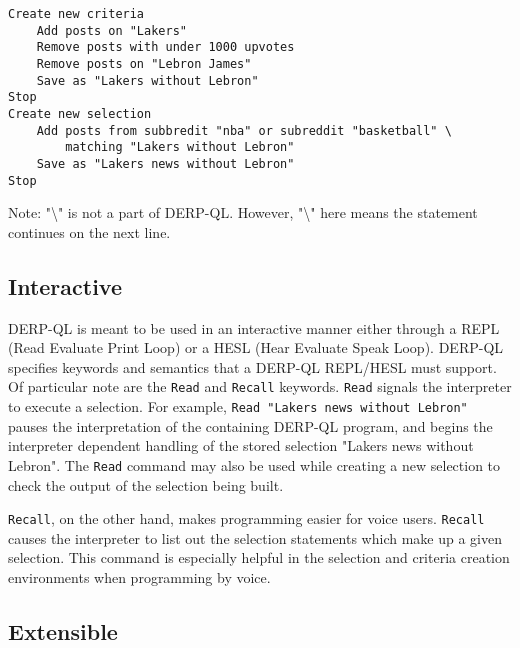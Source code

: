 \begin{lstlisting}
Create new criteria
    Add posts on "Lakers"
    Remove posts with under 1000 upvotes
    Remove posts on "Lebron James"
    Save as "Lakers without Lebron"
Stop
Create new selection
    Add posts from subbredit "nba" or subreddit "basketball" \ 
        matching "Lakers without Lebron"
    Save as "Lakers news without Lebron"
Stop
\end{lstlisting}
Note: "\textbackslash" is not a part of DERP-QL. However, "\textbackslash" here means the statement continues on the next line.

\subsection{Interactive}
DERP-QL is meant to be used in an interactive manner either through a REPL (Read Evaluate Print Loop) or a HESL (Hear Evaluate Speak Loop). DERP-QL specifies keywords and semantics that a DERP-QL REPL/HESL must support. Of particular note are the \texttt{Read} and \texttt{Recall} keywords. \texttt{Read} signals the interpreter to execute a selection. For example, \texttt{Read "Lakers news without Lebron"} pauses the interpretation of the containing DERP-QL program, and begins the interpreter dependent handling of the stored selection "Lakers news without Lebron". The \texttt{Read} command may also be used while creating a new selection to check the output of the selection being built. 

\texttt{Recall}, on the other hand, makes programming easier for voice users. \texttt{Recall} causes the interpreter to list out the selection statements which make up a given selection. This command is especially helpful in the selection and criteria creation environments when programming by voice. 

\subsection{Extensible}


